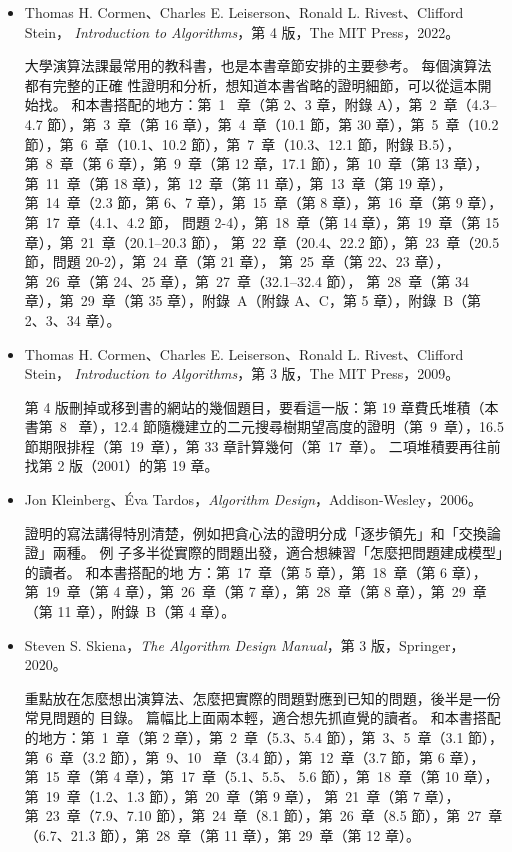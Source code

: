 \begin{itemize}
\item Thomas H. Cormen、Charles E. Leiserson、Ronald L. Rivest、Clifford Stein，
\textit{Introduction to Algorithms}，第 4 版，The MIT Press，2022。

大學演算法課最常用的教科書，也是本書章節安排的主要參考。 每個演算法都有完整的正確
性證明和分析，想知道本書省略的證明細節，可以從這本開始找。 和本書搭配的地方：第~1~
章（第 2、3 章，附錄 A），第~2~章（4.3--4.7 節），第~3~章（第 16 章），第~4~章（10.1
節，第 30 章），第~5~章（10.2 節），第~6~章（10.1、10.2 節），第~7~章（10.3、12.1
節，附錄 B.5），第~8~章（第 6 章），第~9~章（第 12 章，17.1 節），第~10~章（第 13
章），第~11~章（第 18 章），第~12~章（第 11 章），第~13~章（第 19 章），第~14~章（2.3
節，第 6、7 章），第~15~章（第 8 章），第~16~章（第 9 章），第~17~章（4.1、4.2 節，
問題 2-4），第~18~章（第 14 章），第~19~章（第 15 章），第~21~章（20.1--20.3 節），
第~22~章（20.4、22.2 節），第~23~章（20.5 節，問題 20-2），第~24~章（第 21 章），
第~25~章（第 22、23 章），第~26~章（第 24、25 章），第~27~章（32.1--32.4 節），
第~28~章（第 34 章），第~29~章（第 35 章），附錄~A（附錄 A、C，第 5 章），附錄~B（第 2、3、34
章）。

\item Thomas H. Cormen、Charles E. Leiserson、Ronald L. Rivest、Clifford Stein，
\textit{Introduction to Algorithms}，第 3 版，The MIT Press，2009。

第 4 版刪掉或移到書的網站的幾個題目，要看這一版：第 19 章費氏堆積（本書第~8~
章），12.4 節隨機建立的二元搜尋樹期望高度的證明（第~9~章），16.5 節期限排程（第~19~章），第 33 章計算幾何（第~17~章）。 二項堆積要再往前找第 2 版（2001）的第 19 章。

\item Jon Kleinberg、Éva Tardos，\textit{Algorithm Design}，Addison-Wesley，2006。

證明的寫法講得特別清楚，例如把貪心法的證明分成「逐步領先」和「交換論證」兩種。 例
子多半從實際的問題出發，適合想練習「怎麼把問題建成模型」的讀者。 和本書搭配的地
方：第~17~章（第 5 章），第~18~章（第 6 章），第~19~章（第 4 章），第~26~章（第 7 章），第~28~章（第 8
章），第~29~章（第 11 章），附錄~B（第 4 章）。

\item Steven S. Skiena，\textit{The Algorithm Design Manual}，第 3 版，Springer，2020。

重點放在怎麼想出演算法、怎麼把實際的問題對應到已知的問題，後半是一份常見問題的
目錄。 篇幅比上面兩本輕，適合想先抓直覺的讀者。 和本書搭配的地方：第~1~章（第 2
章），第~2~章（5.3、5.4 節），第~3、5~章（3.1 節），第~6~章（3.2 節），第~9、10~
章（3.4 節），第~12~章（3.7 節，第 6 章），第~15~章（第 4 章），第~17~章（5.1、5.5、
5.6 節），第~18~章（第 10 章），第~19~章（1.2、1.3 節），第~20~章（第 9 章），
第~21~章（第 7 章），第~23~章（7.9、7.10 節），第~24~章（8.1 節），第~26~章（8.5
節），第~27~章（6.7、21.3 節），第~28~章（第 11 章），第~29~章（第 12 章）。


\end{itemize}
